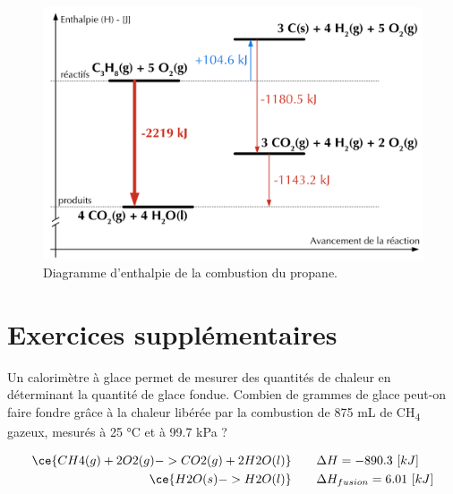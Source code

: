 \documentclass[
  11pt,
  a4paper,
  openany]{book}
\begin{document}
\begin{figure}

{\centering \includegraphics[width=0.67\linewidth]{images/Enthalpie-3} 

}

\caption{Diagramme d'enthalpie de la combustion du propane.}\label{fig:enthalpie-3}
\end{figure}

\hypertarget{exercices-suppluxe9mentaires-14}{%
\section{Exercices supplémentaires}\label{exercices-suppluxe9mentaires-14}}

\begin{Exercise}

Un calorimètre à glace permet de mesurer des quantités de chaleur en déterminant la quantité de glace fondue. Combien de grammes de glace peut-on faire fondre grâce à la chaleur libérée par la combustion de 875 mL de CH\textsubscript{4} gazeux, mesurés à 25 °C et à 99.7 kPa ?

\[
\begin{split}
\ce{CH4(g) + 2 O2(g) -> CO2(g) + 2 H2O(l)} \qquad & \Delta H = - 890.3\ [kJ] \\
\ce{H2O(s) -> H2O(l)} \qquad & \Delta H_{fusion} = 6.01\ [kJ]
\end{split}
\]


\end{Exercise}
\end{document}
